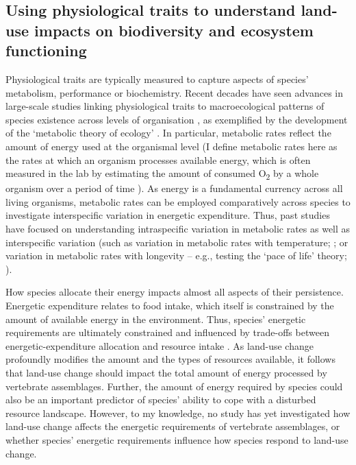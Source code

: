 \subsection{Using physiological traits to understand  land-use impacts on biodiversity and ecosystem functioning}

Physiological traits are typically measured to capture aspects of species' metabolism, performance or biochemistry. Recent decades have seen advances in large-scale studies linking physiological traits to macroecological patterns of species existence across levels of organisation \citep{Chown2004, Burger2021}, as exemplified by the development of the `metabolic theory of ecology' \citep{Gillooly2001a, Brown2004a}. In particular, metabolic rates reflect the amount of energy used at the organismal level (I define metabolic rates here as the rates at which an organism processes available energy, which is often measured in the lab by estimating the amount of consumed O\textsubscript{2} by a whole organism over a period of time \citep{Sadowska2015, Auer2017}). As energy is a fundamental currency across all living organisms, metabolic rates can be employed comparatively across species to investigate interspecific variation in energetic expenditure. Thus, past studies have focused on understanding intraspecific variation in metabolic rates \citep{Burton2011, Auer2017} as well as interspecific variation (such as variation in metabolic rates with temperature; \citet{Clarke2004a}; or variation in metabolic rates with longevity -- e.g., testing the `pace of life' theory; \citet{Stark2020}).

How species allocate their energy impacts almost all aspects of their persistence. Energetic expenditure relates to food intake, which itself is constrained by the amount of available energy in the environment. Thus, species' energetic requirements are ultimately constrained and influenced by trade-offs between energetic-expenditure allocation and resource intake \citep{Auer2020}. As land-use change profoundly modifies the amount and the types of resources available, it follows that land-use change should impact the total amount of energy processed by vertebrate assemblages. Further, the amount of energy required by species could also be an important predictor of species' ability to cope with a disturbed resource landscape. However, to my knowledge, no study has yet investigated how land-use change affects the energetic requirements of vertebrate assemblages, or whether species' energetic requirements influence how species respond to land-use change.


